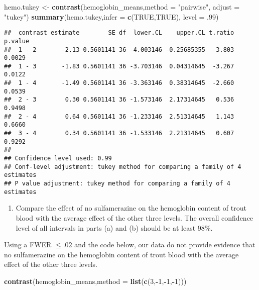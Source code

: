 \documentclass[12pt,]{article}
\newenvironment{Shaded}{\begin{snugshade}}{\end{snugshade}}
\newcommand{\KeywordTok}[1]{\textcolor[rgb]{0.13,0.29,0.53}{\textbf{#1}}}
\newcommand{\DataTypeTok}[1]{\textcolor[rgb]{0.13,0.29,0.53}{#1}}
\newcommand{\DecValTok}[1]{\textcolor[rgb]{0.00,0.00,0.81}{#1}}
\newcommand{\StringTok}[1]{\textcolor[rgb]{0.31,0.60,0.02}{#1}}
\newcommand{\OtherTok}[1]{\textcolor[rgb]{0.56,0.35,0.01}{#1}}
\newcommand{\OperatorTok}[1]{\textcolor[rgb]{0.81,0.36,0.00}{\textbf{#1}}}
\newcommand{\NormalTok}[1]{#1}
\providecommand{\tightlist}{%
  \setlength{\itemsep}{0pt}\setlength{\parskip}{0pt}}
\begin{document}
\begin{Shaded}
\begin{Highlighting}[]
\NormalTok{hemo.tukey <-}\StringTok{ }\KeywordTok{contrast}\NormalTok{(hemoglobin_means,}\DataTypeTok{method =} \StringTok{"pairwise"}\NormalTok{, }\DataTypeTok{adjust =} \StringTok{"tukey"}\NormalTok{)}
\KeywordTok{summary}\NormalTok{(hemo.tukey,}\DataTypeTok{infer =} \KeywordTok{c}\NormalTok{(}\OtherTok{TRUE}\NormalTok{,}\OtherTok{TRUE}\NormalTok{), }\DataTypeTok{level =}\NormalTok{ .}\DecValTok{99}\NormalTok{)}
\end{Highlighting}
\end{Shaded}

\begin{verbatim}
##  contrast estimate        SE df  lower.CL    upper.CL t.ratio p.value
##  1 - 2       -2.13 0.5601141 36 -4.003146 -0.25685355  -3.803  0.0029
##  1 - 3       -1.83 0.5601141 36 -3.703146  0.04314645  -3.267  0.0122
##  1 - 4       -1.49 0.5601141 36 -3.363146  0.38314645  -2.660  0.0539
##  2 - 3        0.30 0.5601141 36 -1.573146  2.17314645   0.536  0.9498
##  2 - 4        0.64 0.5601141 36 -1.233146  2.51314645   1.143  0.6660
##  3 - 4        0.34 0.5601141 36 -1.533146  2.21314645   0.607  0.9292
## 
## Confidence level used: 0.99 
## Conf-level adjustment: tukey method for comparing a family of 4 estimates 
## P value adjustment: tukey method for comparing a family of 4 estimates
\end{verbatim}

\begin{enumerate}
\def\labelenumi{(\alph{enumi})}
\setcounter{enumi}{1}
\tightlist
\item
  Compare the effect of no sulfamerazine on the hemoglobin content of
  trout blood with the average effect of the other three levels. The
  overall confidence level of all intervals in parts (a) and (b) should
  be at least 98\%.
\end{enumerate}

Using a FWER \(\leq .02\) and the code below, our data do not provide
evidence that no sulfamerazine on the hemoglobin content of trout blood
with the average effect of the other three levels.

\begin{Shaded}
\begin{Highlighting}[]
\KeywordTok{contrast}\NormalTok{(hemoglobin_means,}\DataTypeTok{method =} \KeywordTok{list}\NormalTok{(}\KeywordTok{c}\NormalTok{(}\DecValTok{3}\NormalTok{,}\OperatorTok{-}\DecValTok{1}\NormalTok{,}\OperatorTok{-}\DecValTok{1}\NormalTok{,}\OperatorTok{-}\DecValTok{1}\NormalTok{)))}
\end{Highlighting}
\end{Shaded}
\end{document}
